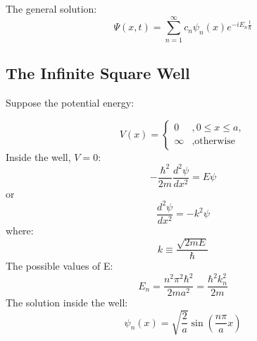 \documentclass{article}
\begin{document}
The general solution: 
\begin{equation}
    \Psi(x,t) =  \sum_{n=1}^{\infty}c_n \psi_n(x) e^{-iE_n\frac{t}{\hbar}}
\end{equation}

\subsection*{The Infinite Square Well}

Suppose the potential energy:

\begin{equation}
    V(x) = 
    \begin{cases}
        0 & ,0 \leq x \leq a, \\
        \infty &, \text{otherwise}
    \end{cases}
\end{equation}
Inside the well, \(V = 0\):
\[-\frac{\hbar^2}{2m}\frac{d^2\psi}{dx^2} = E\psi\]
or
\[\frac{d^2\psi}{dx^2}=-k^2\psi\]
where: 
\[k \equiv \frac{\sqrt{2mE}}{\hbar}\]
The possible values of E:
\begin{equation}
    E_n = \frac{n^2\pi^2\hbar^2}{2ma^2} = \frac{\hbar^2 k_n^2}{2m}
\end{equation}
The solution inside the well:
\begin{equation}
    \psi_n(x) = \sqrt{\frac{2}{a}}\sin(\frac{n\pi}{a}x)
\end{equation}
\end{document}
